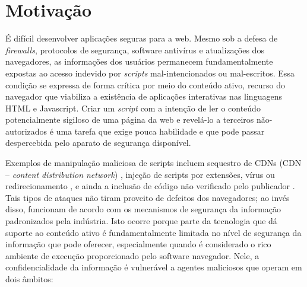 \section{Motivação}


É difícil desenvolver aplicações seguras para a web. Mesmo sob a defesa de \textit{firewalls}, protocolos de segurança, software antivírus e atualizações dos navegadores, as informações dos usuários permanecem fundamentalmente expostas ao acesso indevido por \textit{scripts} mal-intencionados ou mal-escritos. Essa condição se expressa de forma crítica por meio do conteúdo ativo, recurso do navegador que viabiliza a existência de aplicações interativas nas linguagens HTML e Javascript. Criar um \textit{script} com a intenção de ler o conteúdo potencialmente sigiloso de uma página da web e revelá-lo a terceiros não-autorizados é uma tarefa que exige pouca habilidade e que pode passar despercebida pelo aparato de segurança disponível.

Exemplos de manipulação maliciosa de scripts incluem sequestro de CDNs (CDN -- \textit{content distribution network}) \cite{Dorfman2013}, injeção de scripts por extensões, vírus ou redirecionamento \cite{Kinlan2015}, e ainda a inclusão de código não verificado pelo publicador \cite{Vanunu2016}. Tais tipos de ataques não tiram proveito de defeitos dos navegadores; ao invés disso, funcionam de acordo com os mecanismos de segurança da informação padronizados pela indústria. Isto ocorre porque parte da tecnologia que dá suporte ao conteúdo ativo é fundamentalmente limitada no nível de segurança da informação que pode oferecer, especialmente quando é considerado o rico ambiente de execução proporcionado pelo software navegador. Nele, a confidencialidade da informação é vulnerável a agentes maliciosos que operam em dois âmbitos:

